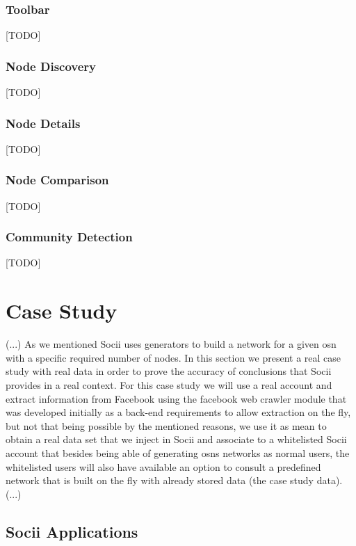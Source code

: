 \subsubsection{Toolbar}
[TODO]

\subsubsection{Node Discovery}
[TODO]

\subsubsection{Node Details}
[TODO]

\subsubsection{Node Comparison}
[TODO]

\subsubsection{Community Detection}
[TODO]

\section{Case Study}
(...)
As we mentioned Socii uses generators to build a network for a given \gls{osn} with a specific required number of nodes. In this section we present
a real case study with real data in order to prove the accuracy of conclusions that Socii provides in a real context. For this case study we will use
a real account and extract information from Facebook using the facebook web crawler module that was developed initially as a back-end requirements to allow extraction on the fly, but not that being possible by the mentioned reasons, we use it as mean to obtain a real data set that we inject in Socii and associate to a whitelisted Socii account that besides being able of generating \glspl{osn} networks as normal users, the whitelisted users will also have available an option to consult a predefined network that is built on the fly with already stored data (the case study data).
(...)

\subsection{Socii Applications}


